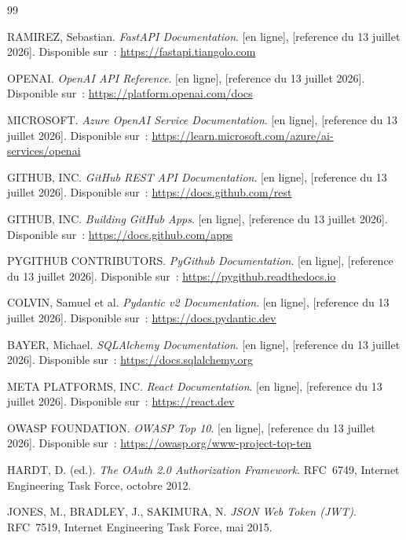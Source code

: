 \documentclass[a4paper,12pt,oneside]{report}
\begin{document}
\begin{thebibliography}{99}

RAMIREZ, Sebastian. \emph{FastAPI Documentation}. [en ligne], [reference du 13 juillet 2026]. Disponible sur~: \url{https://fastapi.tiangolo.com}

OPENAI. \emph{OpenAI API Reference}. [en ligne], [reference du 13 juillet 2026]. Disponible sur~: \url{https://platform.openai.com/docs}

MICROSOFT. \emph{Azure OpenAI Service Documentation}. [en ligne], [reference du 13 juillet 2026]. Disponible sur~: \url{https://learn.microsoft.com/azure/ai-services/openai}

GITHUB, INC. \emph{GitHub REST API Documentation}. [en ligne], [reference du 13 juillet 2026]. Disponible sur~: \url{https://docs.github.com/rest}

GITHUB, INC. \emph{Building GitHub Apps}. [en ligne], [reference du 13 juillet 2026]. Disponible sur~: \url{https://docs.github.com/apps}

PYGITHUB CONTRIBUTORS. \emph{PyGithub Documentation}. [en ligne], [reference du 13 juillet 2026]. Disponible sur~: \url{https://pygithub.readthedocs.io}

COLVIN, Samuel et al. \emph{Pydantic v2 Documentation}. [en ligne], [reference du 13 juillet 2026]. Disponible sur~: \url{https://docs.pydantic.dev}

BAYER, Michael. \emph{SQLAlchemy Documentation}. [en ligne], [reference du 13 juillet 2026]. Disponible sur~: \url{https://docs.sqlalchemy.org}

META PLATFORMS, INC. \emph{React Documentation}. [en ligne], [reference du 13 juillet 2026]. Disponible sur~: \url{https://react.dev}

OWASP FOUNDATION. \emph{OWASP Top 10}. [en ligne], [reference du 13 juillet 2026]. Disponible sur~: \url{https://owasp.org/www-project-top-ten}

HARDT, D. (ed.). \emph{The OAuth 2.0 Authorization Framework}. RFC~6749, Internet Engineering Task Force, octobre 2012.

JONES, M., BRADLEY, J., SAKIMURA, N. \emph{JSON Web Token (JWT)}. RFC~7519, Internet Engineering Task Force, mai 2015.

\end{thebibliography}
\end{document}
